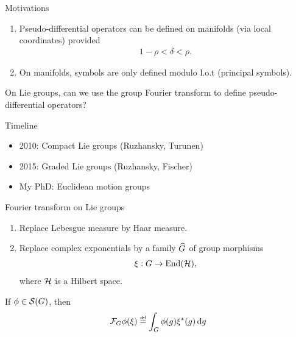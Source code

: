 \documentclass{beamer}
\begin{document}
\begin{frame}
    {Motivations}

    \pause
    \begin{enumerate}
        \item
            Pseudo-differential operators can be defined on manifolds (via local coordinates)
            provided
            \begin{align*}
                1 - \rho < \delta < \rho.
            \end{align*}
            \pause
        \item
            On manifolds, symbols are only defined modulo l.o.t (principal symbols).
    \end{enumerate}

    On Lie groups,
    can we use the group Fourier transform to define pseudo-differential operators?
\end{frame}

\begin{frame}
    {Timeline}

    \begin{itemize}
        \pause
        \item 2010: Compact Lie groups (Ruzhansky, Turunen)
        \pause
        \item 2015: Graded Lie groups (Ruzhansky, Fischer)
        \pause
        \item My PhD: Euclidean motion groups
    \end{itemize}
\end{frame}

\begin{frame}
    {Fourier transform on Lie groups}

    \begin{enumerate}
        \item Replace Lebesgue measure by Haar measure.
            \pause
        \item Replace complex exponentials by a family ${\widehat{G}}$ of group morphisms
            \begin{align*}
                \xi : G \to \operatorname{End}(\mathcal{H}),
            \end{align*}
            where $\mathcal{H}$ is a Hilbert space.
    \end{enumerate}
    \pause
    If $\phi \in {\mathcal{S} (G)}$,
    then
    \begin{align*}
        \Fourier \phi(\xi) \defeq \int_\Group \phi(g) \adj \xi(g) \dd g
    \end{align*}
\end{frame}
\end{document}
